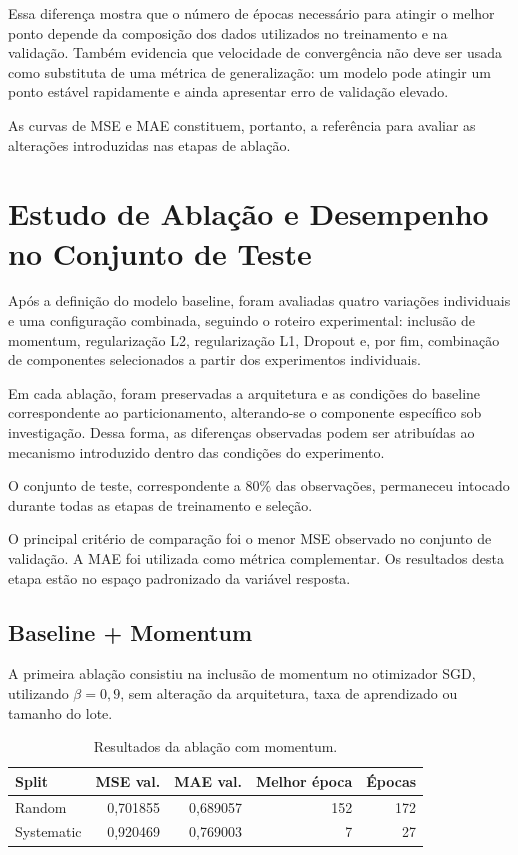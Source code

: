 \documentclass[11pt,a4paper]{article}
\begin{document}
Essa diferença mostra que o número de épocas necessário para atingir o
melhor ponto depende da composição dos dados utilizados no treinamento
e na validação. Também evidencia que velocidade de convergência não
deve ser usada como substituta de uma métrica de generalização: um
modelo pode atingir um ponto estável rapidamente e ainda apresentar
erro de validação elevado.

As curvas de MSE e MAE constituem, portanto, a referência para avaliar
as alterações introduzidas nas etapas de ablação.


\section{Estudo de Ablação e Desempenho no Conjunto de Teste}

Após a definição do modelo baseline, foram avaliadas quatro variações
individuais e uma configuração combinada, seguindo o roteiro
experimental: inclusão de momentum, regularização L2, regularização L1,
Dropout e, por fim, combinação de componentes selecionados a partir dos
experimentos individuais.

Em cada ablação, foram preservadas a arquitetura e as condições do
baseline correspondente ao particionamento, alterando-se o componente
específico sob investigação. Dessa forma, as diferenças observadas
podem ser atribuídas ao mecanismo introduzido dentro das condições do
experimento.

O conjunto de teste, correspondente a 80\% das observações, permaneceu
intocado durante todas as etapas de treinamento e seleção.

O principal critério de comparação foi o menor MSE observado no conjunto
de validação. A MAE foi utilizada como métrica complementar. Os
resultados desta etapa estão no espaço padronizado da variável resposta.


\subsection{Baseline + Momentum}

A primeira ablação consistiu na inclusão de momentum no otimizador SGD,
utilizando $\beta=0,9$, sem alteração da arquitetura, taxa de
aprendizado ou tamanho do lote.

\begin{table}[H]
\centering
\small
\caption{Resultados da ablação com momentum.}
\label{tab:momentum_ablation}
\begin{tabular}{lrrrr}
\toprule
\textbf{Split} &
\textbf{MSE val.} &
\textbf{MAE val.} &
\textbf{Melhor época} &
\textbf{Épocas} \\
\midrule
Random &
0,701855 &
0,689057 &
152 &
172 \\

Systematic &
0,920469 &
0,769003 &
7 &
27 \\
\bottomrule
\end{tabular}
\end{table}
\end{document}
